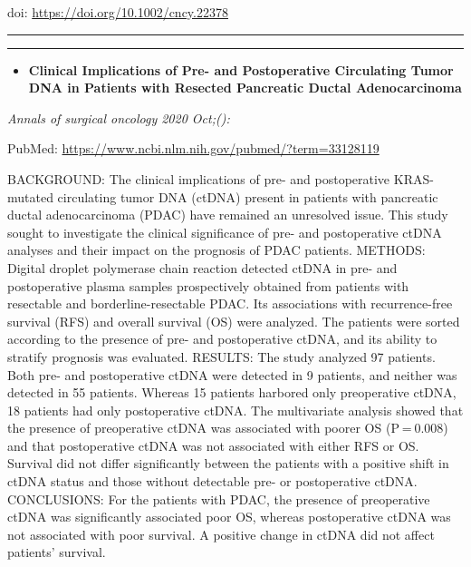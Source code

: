\documentclass[
]{article}
\providecommand{\tightlist}{%
  \setlength{\itemsep}{0pt}\setlength{\parskip}{0pt}}
\begin{document}
doi: \url{https://doi.org/10.1002/cncy.22378}

\begin{center}\rule{0.5\linewidth}{0.5pt}\end{center}

\begin{center}\rule{0.5\linewidth}{0.5pt}\end{center}

\begin{itemize}
\tightlist
\item
  \textbf{Clinical Implications of Pre- and Postoperative Circulating
  Tumor DNA in Patients with Resected Pancreatic Ductal Adenocarcinoma}
\end{itemize}

\emph{Annals of surgical oncology 2020 Oct;():}

PubMed: \url{https://www.ncbi.nlm.nih.gov/pubmed/?term=33128119}

BACKGROUND: The clinical implications of pre- and postoperative
KRAS-mutated circulating tumor DNA (ctDNA) present in patients with
pancreatic ductal adenocarcinoma (PDAC) have remained an unresolved
issue. This study sought to investigate the clinical significance of
pre- and postoperative ctDNA analyses and their impact on the prognosis
of PDAC patients. METHODS: Digital droplet polymerase chain reaction
detected ctDNA in pre- and postoperative plasma samples prospectively
obtained from patients with resectable and borderline-resectable PDAC.
Its associations with recurrence-free survival (RFS) and overall
survival (OS) were analyzed. The patients were sorted according to the
presence of pre- and postoperative ctDNA, and its ability to stratify
prognosis was evaluated. RESULTS: The study analyzed 97 patients. Both
pre- and postoperative ctDNA were detected in 9 patients, and neither
was detected in 55 patients. Whereas 15 patients harbored only
preoperative ctDNA, 18 patients had only postoperative ctDNA. The
multivariate analysis showed that the presence of preoperative ctDNA was
associated with poorer OS (P = 0.008) and that postoperative ctDNA was
not associated with either RFS or OS. Survival did not differ
significantly between the patients with a positive shift in ctDNA status
and those without detectable pre- or postoperative ctDNA. CONCLUSIONS:
For the patients with PDAC, the presence of preoperative ctDNA was
significantly associated poor OS, whereas postoperative ctDNA was not
associated with poor survival. A positive change in ctDNA did not affect
patients' survival.
\end{document}
